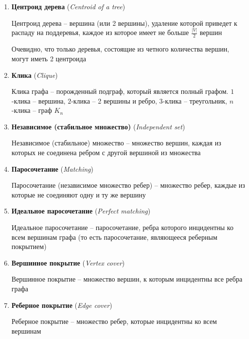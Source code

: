 \documentclass[12pt]{article}
\begin{document}
\begin{enumerate}
        Центр графа -- вершина (вершины), эксцентриситет которой равен радиусу графа: $\text{center}(G) = \Set{v \in V \ | \ \varepsilon(v) = \text{rad}(G)}$

        \item \textbf{Центроид дерева} (\textit{Centroid of a tree})

        Центроид дерева -- вершина (или 2 вершины), удаление которой приведет к распаду на поддеревья, каждое из которое имеет не больше $\frac{|V|}{2}$ вершин

        Очевидно, что только деревья, состоящие из четного количества вершин, могут иметь 2 центроида


        \item \textbf{Клика} (\textit{Clique})

        Клика графа -- порожденный подграф, который является полный графом. $1$-клика -- вершина, $2$-клика -- 2 вершины и ребро, $3$-клика -- треугольник, $n$-клика -- граф $K_n$

        \item \textbf{Независимое (стабильное множество)} (\textit{Independent set})

        Независимое (стабильное) множество -- множество вершин, каждая из которых не соединена ребром с другой вершиной из множества

        \item \textbf{Паросочетание} (\textit{Matching})

        Паросочетание (независимое множество ребер) -- множество ребер, каждые из которые не соединяют одну и ту же вершину

        \item \textbf{Идеальное паросочетание} (\textit{Perfect matching})

        Идеальное паросочетание -- паросочетание, ребра которого инцидентны ко всем вершинам графа (то есть паросочетание, являющееся реберным покрытием)

        \item \textbf{Вершинное покрытие} (\textit{Vertex cover})

        Вершинное покрытие -- множество вершин, к которым инцидентны все ребра графа

        \item \textbf{Реберное покрытие} (\textit{Edge cover})

        Реберное покрытие -- множество ребер, которые инцидентны ко всем вершинам


\end{enumerate}
\end{document}
